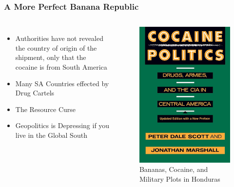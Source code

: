 \documentclass{beamer}
\begin{document}
\begin{frame}
\frametitle{A More Perfect Banana Republic}
    \begin{columns}
    \begin{itemize}
        \item Authorities have not revealed the country of origin of the shipment, only that the cocaine is from South America
        \item Many SA Countries effected by Drug Cartels
        \item The Resource Curse
        \item Geopolitics is Depressing if you live in the Global South
    \end{itemize}
    \begin{figure}
    \centering
        \includegraphics[width=\textwidth, height=\textwidth, keepaspectratio]{cocaine politics.jpg}
        \caption{Bananas, Cocaine, and Military Plots in Honduras}
        \label{fig:3}
    \end{figure}
    \end{columns}
\end{frame}
\end{document}
